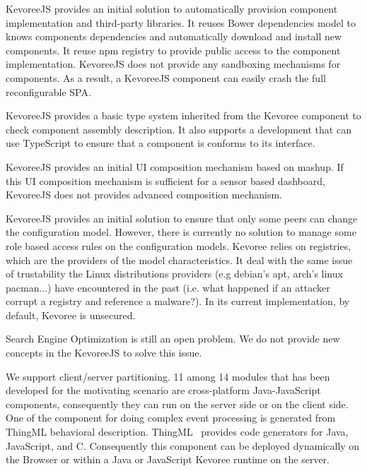 \begin{description}
	

\item KevoreeJS provides an initial solution to automatically provision component implementation and third-party libraries. It reuses Bower dependencies model to knows components dependencies and automatically download and install new components. It reuse npm registry to provide public access to the component implementation. KevoreeJS does not provide any sandboxing mechanisms for components. As a result, a KevoreeJS component can easily crash the full reconfigurable SPA. 

\item KevoreeJS provides a basic type system inherited from the Kevoree component to check component assembly description. It also supports a development that can use TypeScript to ensure that a component is conforms to its interface.  

\item KevoreeJS provides an initial UI composition mechanism based on mashup. If this UI composition mechanism is sufficient for a sensor based dashboard, KevoreeJS does not provides advanced composition mechanism.  

\item KevoreeJS provides an initial solution to ensure that only some peers can change the configuration model. However, there is currently no solution to manage some role based access rules on the configuration models. Kevoree relies on registries, which are the providers of the model characteristics. It deal with the same issue of trustability the Linux distributions providers (e.g debian's apt, arch's linux pacman...) have encountered in the past (i.e. what happened if an attacker corrupt a registry and reference a malware?).  In its current implementation, by default, Kevoree is unsecured.   

\item Search Engine Optimization is still an open problem. We do not provide new concepts in the KevoreeJS to solve this issue.    

\item We support client/server partitioning. 11 among 14 modules that has been developed for the motivating scenario are cross-platform Java-JavaScript components, consequently they can run on the server side or on the client side.  One of the component for doing complex event processing is generated from ThingML behavioral description. ThingML~\cite{DBLP:conf/models/FleureyMSB11} provides code generators for Java, JavaScript, and C. Consequently this component can be deployed dynamically on the Browser or within a Java or JavaScript Kevoree runtime on the server.  


\end{description}
